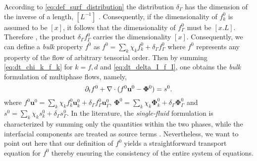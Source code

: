 According to \ref{eq:def_surf_distribution} the distribution  $\delta_\Gamma$ has the dimension of the inverse of a length, $[L^{-1}]$ \citep{appel2007}. 
Consequently, if the dimensionality of $f_k^0$ is assumed to be $[x]$, it follows that the dimensionality of $f_\Gamma^0$ must be $[x.L]$. Therefore , the product $\delta_\Gamma f_\Gamma^0$ carries the dimensionality $[x]$. %
Consequently, we can define a \textit{bulk} property $f^0$ as $f^0 = \sum_{k} \chi_k f_k^0 + \delta_\Gamma  f_\Gamma^0$ where $f^0$ represents any property of the flow of arbitrary tensorial order.
Then by summing \ref{eq:dt_chi_k_f_k} for $k=f,d$ and \ref{eq:dt_delta_I_f_I}, one obtains the \textit{bulk} formulation of multiphase flows, namely,%
\begin{equation}
   \pddt f^0
   + \div (
       f^0\textbf{u}^0
       -  \mathbf{\Phi}^0 
    )
   = s^0. 
   \label{eq:dt_f}
\end{equation}
where $f^0 \textbf{u}^0 = \sum_{k} \chi_k {f}_k^0\textbf{u}_k^0 + \delta_\Gamma  {f}_\Gamma^0\textbf{u}_\Gamma^0$, $\mathbf{\Phi}^0 = \sum_{k} \chi_k \mathbf{\Phi}_k^0 + \delta_\Gamma  \mathbf{\Phi}_\Gamma^0$ and $s^0 = \sum_{k} \chi_k s_k^0 + \delta_\Gamma  s_\Gamma^0$. 
In the literature, the \textit{single-fluid} formulation is characterized by summing only the quantities within the two phases, while the interfacial components are treated as source terms \citep{tryggvason2011direct,morel2015mathematical}.
Nevertheless, we want to point out here that our definition of $f^0$ yields a straightforward transport equation for $f^0$ thereby ensuring the consistency of the entire system of equations.



